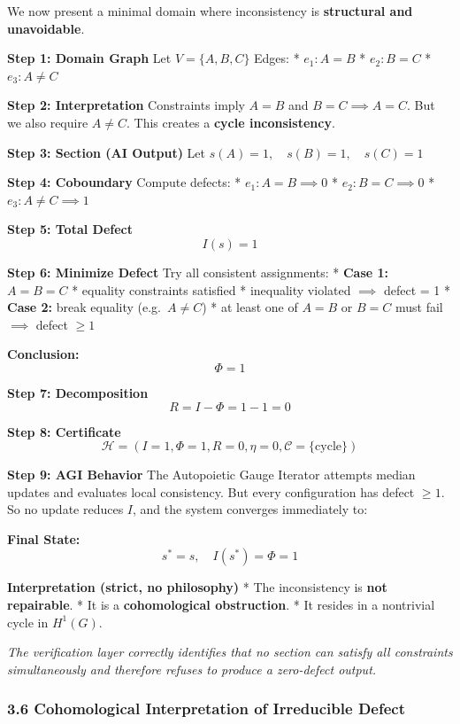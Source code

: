 \documentclass[
]{article}
\begin{document}
We now present a minimal domain where inconsistency is
\textbf{structural and unavoidable}.

\textbf{Step 1: Domain Graph} Let \(V = \{A, B, C\}\) Edges: *
\(e_1: A = B\) * \(e_2: B = C\) * \(e_3: A \neq C\)

\textbf{Step 2: Interpretation} Constraints imply \(A = B\) and
\(B = C \implies A = C\). But we also require \(A \neq C\). This creates
a \textbf{cycle inconsistency}.

\textbf{Step 3: Section (AI Output)} Let
\(s(A) = 1, \quad s(B) = 1, \quad s(C) = 1\)

\textbf{Step 4: Coboundary} Compute defects: * \(e_1: A = B \implies 0\)
* \(e_2: B = C \implies 0\) * \(e_3: A \neq C \implies 1\)

\textbf{Step 5: Total Defect} \[ I(s) = 1 \]

\textbf{Step 6: Minimize Defect} Try all consistent assignments: *
\textbf{Case 1:} \(A = B = C\) * equality constraints satisfied *
inequality violated \(\implies\) defect = 1 * \textbf{Case 2:} break
equality (e.g.~\(A \neq C\)) * at least one of \(A = B\) or \(B = C\)
must fail \(\implies\) defect \(\geq 1\)

\textbf{Conclusion:} \[ \Phi = 1 \]

\textbf{Step 7: Decomposition} \[ R = I - \Phi = 1 - 1 = 0 \]

\textbf{Step 8: Certificate}
\[ \mathcal{H} = (I=1, \Phi=1, R=0, \eta=0, \mathcal{C}=\{\text{cycle}\}) \]

\textbf{Step 9: AGI Behavior} The Autopoietic Gauge Iterator attempts
median updates and evaluates local consistency. But every configuration
has defect \(\geq 1\). So no update reduces \(I\), and the system
converges immediately to:

\textbf{Final State:} \[ s^* = s, \quad I(s^*) = \Phi = 1 \]

\textbf{Interpretation (strict, no philosophy)} * The inconsistency is
\textbf{not repairable}. * It is a \textbf{cohomological obstruction}. *
It resides in a nontrivial cycle in \(H^1(G)\).

\emph{The verification layer correctly identifies that no section can
satisfy all constraints simultaneously and therefore refuses to produce
a zero-defect output.}

\subsubsection{3.6 Cohomological Interpretation of Irreducible
Defect}\label{cohomological-interpretation-of-irreducible-defect}
\end{document}

